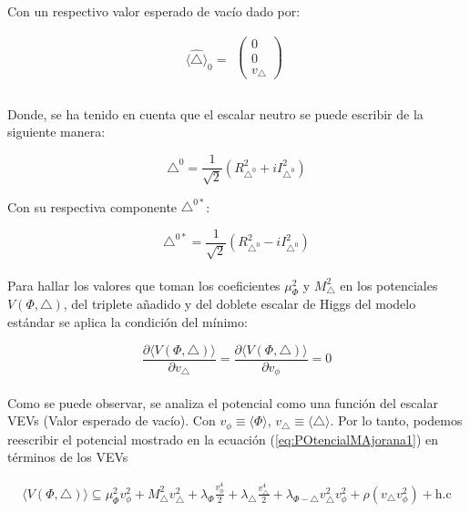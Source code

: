 \documentclass[12pt]{article}
\begin{document}
Con un respectivo valor esperado de vacío dado por:

\begin{equation}
\langle \hat\triangle \rangle_0 =
\begin{aligned}
    \begin{pmatrix}  0 \\ 0 \\  v_\triangle \end{pmatrix} \\
\end{aligned}
\end{equation} \\
 
 
Donde, se ha tenido en cuenta que el escalar neutro se puede escribir de la siguiente manera:

\[\triangle^{0}=\frac{1}{\sqrt{2}}(R_{\triangle^{0}}^{2} + iI_{\triangle^{0}}^{2} )\]

Con su respectiva componente $\triangle^{0*}$:

\[\triangle^{0*}=\frac{1}{\sqrt{2}}(R_{\triangle^{0}}^{2} - iI_{\triangle^{0}}^{2} )\] \\

Para hallar los valores que toman los coeficientes $\mu^{2}_\Phi$ y $M^{2}_\triangle$ en los potenciales $V(\Phi,\triangle)$, del triplete añadido y del doblete escalar de Higgs del modelo estándar se aplica la condición del mínimo: 


\begin{equation}
    \frac{\partial{\langle V(\Phi, \triangle) }\rangle }{\partial v_\triangle} = \frac{\partial{\langle V(\Phi,\triangle) }\rangle }{\partial v_\phi}= 0
\end{equation}\\ 

Como se puede observar, se analiza el potencial como una función del escalar VEVs (Valor esperado de vacío). Con  $v_\phi \equiv \langle \Phi \rangle$,  $v_\triangle \equiv \langle \triangle \rangle$. Por lo tanto, podemos reescribir  el potencial mostrado en la ecuación (\ref{eq:POtencialMAjorana1})  en términos de los  VEVs

  \begin{equation}
  \begin{aligned}
  \label{eq:PotencialDiracSee3}
          \langle V(\Phi, \triangle) \rangle \subseteq    \mu_\Phi^2 {v_\phi^2} + M_\triangle^2  {v_\triangle^2} + \lambda_\Phi \frac{v_\phi^4}{2} + \lambda_\triangle \frac{v_\triangle^4}{2} +  \lambda_{ \Phi-\triangle} v^2_\triangle v^2 _\phi + \rho(v_\triangle v^2_\phi) + \text{h.c} 
  \end{aligned}
    \end{equation}
\end{document}
